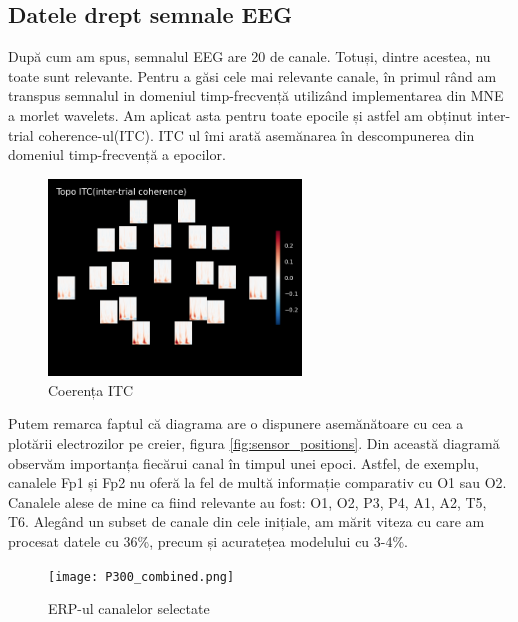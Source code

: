 \subsection{Datele drept semnale EEG}
După cum am spus, semnalul EEG are 20 de canale. Totuși, dintre acestea, nu toate sunt relevante. Pentru a găsi cele mai relevante canale, în primul rând am transpus semnalul in domeniul timp-frecvență utilizând implementarea din MNE\cite{MNE} a morlet wavelets. Am aplicat asta pentru toate epocile și astfel am obținut inter-trial coherence-ul(ITC). ITC ul îmi arată asemănarea în descompunerea din domeniul timp-frecvență a epocilor.

\setlength{\abovecaptionskip}{0pt}
\setlength{\belowcaptionskip}{0pt}
\clearpage
\begin{figure}[h]
    \centering
    \includegraphics[width=0.6\textwidth]{images/itc_epochs.png}
    \caption{Coerența ITC}
    \label{fig:enter-label}
\end{figure}

Putem remarca faptul că diagrama are o dispunere asemănătoare cu cea a plotării electrozilor pe creier, figura \ref{fig:sensor_positions}. Din această diagramă observăm importanța fiecărui canal în timpul unei epoci. Astfel, de exemplu, canalele Fp1 și Fp2 nu oferă la fel de multă informație comparativ cu O1 sau O2. Canalele alese de mine ca fiind relevante au fost: O1, O2, P3, P4, A1, A2, T5, T6. Alegând un subset de canale din cele inițiale, am mărit viteza cu care am procesat datele cu 36\%, precum și acuratețea modelului cu 3-4\%.

\vspace{1em}
\begin{figure}[!h]
    \centering
    \texttt{[image: P300\_combined.png]}
    \caption{ERP-ul canalelor selectate}
    \label{fig:enter-label}
\end{figure}

